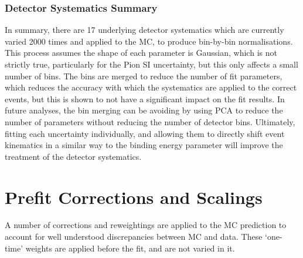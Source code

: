 \subsubsection{Detector Systematics Summary}

In summary, there are 17 underlying detector systematics which are currently varied 2000 times and applied to the MC, to produce bin-by-bin normalisations. This process assumes the shape of each parameter is Gaussian, which is not strictly true, particularly for the Pion SI uncertainty, but this only affects a small number of bins. The bins are merged to reduce the number of fit parameters, which reduces the accuracy with which the systematics are applied to the correct events, but this is shown to not have a significant impact on the fit results. In future analyses, the bin merging can be avoiding by using PCA to reduce the number of parameters without reducing the number of detector bins. Ultimately, fitting each uncertainty individually, and allowing them to directly shift event kinematics in a similar way to the binding energy parameter will improve the treatment of the detector systematics.

\section{Prefit Corrections and Scalings}\label{sec:corr}

A number of corrections and reweightings are applied to the MC prediction to account for well understood discrepancies between MC and data. These `one-time' weights are applied before the fit, and are not varied in it. 

